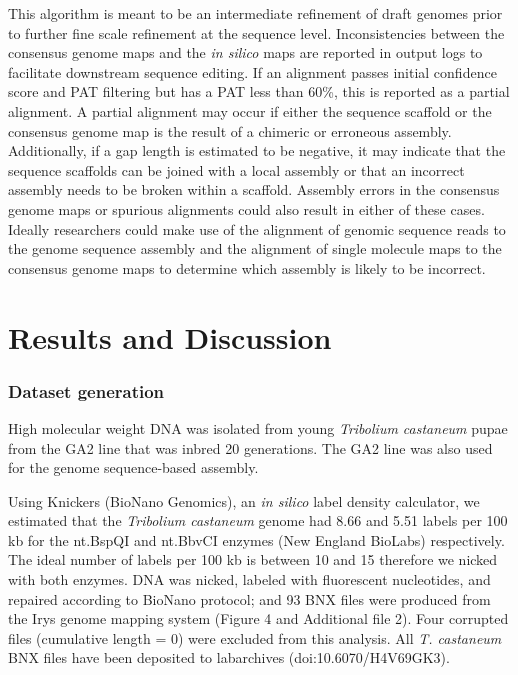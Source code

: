 \documentclass{bmcart}
\begin{document}
This algorithm is meant to be an intermediate refinement of draft genomes prior to further fine scale refinement at the sequence level. Inconsistencies between the consensus genome maps and the \textit{in silico} maps are reported in output logs to facilitate downstream sequence editing. If an alignment passes initial confidence score and PAT filtering but has a PAT less than 60\%, this is reported as a partial alignment. A partial alignment may occur if either the sequence scaffold or the consensus genome map is the result of a chimeric or erroneous assembly. Additionally, if a gap length is estimated to be negative, it may indicate that the sequence scaffolds can be joined with a local assembly or that an incorrect assembly needs to be broken within a scaffold. Assembly errors in the consensus genome maps or spurious alignments could also result in either of these cases. Ideally researchers could make use of the alignment of genomic sequence reads to the genome sequence assembly and the alignment of single molecule maps to the consensus genome maps to determine which assembly is likely to be incorrect.
 
\section*{Results and Discussion}

\subsubsection*{Dataset generation}
High molecular weight DNA was isolated from young \textit{Tribolium castaneum} pupae from the GA2 line that was inbred 20 generations. The GA2 line was also used for the genome sequence-based assembly.

Using Knickers (BioNano Genomics), an \textit{in silico} label density calculator, we estimated that the \textit{Tribolium castaneum} genome had 8.66 and 5.51 labels per 100 kb for the nt.BspQI and nt.BbvCI enzymes (New England BioLabs) respectively. The ideal number of labels per 100 kb is between 10 and 15 therefore we nicked with both enzymes. DNA was nicked, labeled with fluorescent nucleotides, and repaired according to BioNano protocol; and 93 BNX files were produced from the Irys genome mapping system (Figure 4 and Additional file 2). Four corrupted files (cumulative length = 0) were excluded from this analysis. All \textit{T. castaneum} BNX files have been deposited to labarchives (doi:10.6070/H4V69GK3). 
\end{document}
